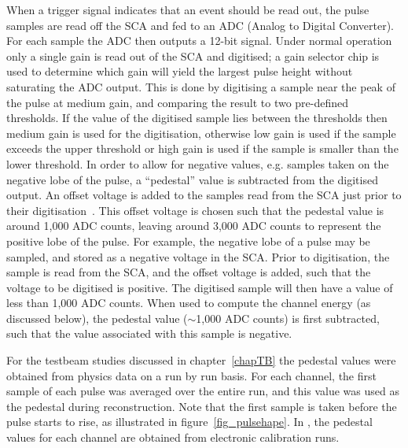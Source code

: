 When a trigger signal indicates that an event should be read out, the pulse samples are read off the SCA and fed to an ADC (Analog to Digital Converter). For each sample the ADC then outputs a 12-bit signal. Under normal operation only a single gain is read out of the SCA and digitised; a gain selector chip is used to determine which gain will yield the largest pulse height without saturating the ADC output. This is done by digitising a sample near the peak of the pulse at medium gain, and comparing the result to two pre-defined thresholds. If the value of the digitised sample lies between the thresholds then medium gain is used for the digitisation, otherwise low gain is used if the sample exceeds the upper threshold or high gain is used if the sample is smaller than the lower threshold.
In order to allow for negative values, e.g. samples taken on the negative lobe of the pulse, a ``pedestal'' value is subtracted from the digitised output. An offset voltage is added to the samples read from the SCA just prior to their digitisation~\cite{ATLAS_FEB_design}. This offset voltage is chosen such that the pedestal value is around 1,000 ADC counts, leaving around 3,000 ADC counts to represent the positive lobe of the pulse. For example, the negative lobe of a pulse may be sampled, and stored as a negative voltage in the SCA. Prior to digitisation, the sample is read from the SCA, and the offset voltage is added, such that the voltage to be digitised is positive. The digitised sample will then have a value of less than 1,000 ADC counts. When used to compute the channel energy (as discussed below), the pedestal value ($\sim$1,000 ADC counts) is first subtracted, such that the value associated with this sample is negative.

For the testbeam studies discussed in chapter~\ref{chapTB} the pedestal values were obtained from physics data on a run by run basis. For each channel, the first sample of each pulse was averaged over the entire run, and this value was used as the pedestal during reconstruction. Note that the first sample is taken before the pulse starts to rise, as illustrated in figure~\ref{fig_pulsehape}. In \atlas, the pedestal values for each channel are obtained from electronic calibration runs.



